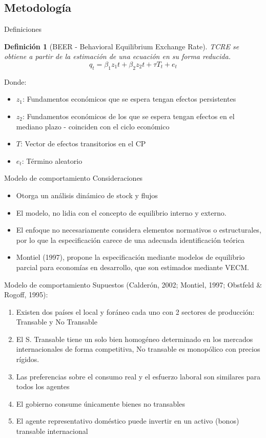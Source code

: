 \documentclass{beamer}
\newtheorem{definic}{Definición}[section]
\begin{document}
\subsection[Metodología]{Metodología}
\begin{frame}{Definiciones}
\begin{definic}[BEER - Behavioral Equilibrium Exchange Rate]
TCRE se obtiene a partir de la estimación de una ecuación en su forma reducida. 
\begin{equation}\label{BEER}
q_t=\beta_1 z_1t + \beta_2 z_2t + \tau T_t + e_t
\end{equation}
\end{definic}
Donde: 
\begin{itemize}
\item $z_1$: Fundamentos económicos que se espera tengan efectos persistentes
\item $z_2$: Fundamentos económicos de los que se espera tengan efectos en el mediano plazo - coinciden con el ciclo económico
\item $T$: Vector de efectos transitorios en el CP
\item $e_t$: Término aleatorio
\end{itemize}
\end{frame}

\begin{frame}{Modelo de comportamiento}
Consideraciones
\begin{itemize}
\item Otorga un análisis dinámico de stock y flujos
\item El modelo, no lidia con el concepto de equilibrio interno y externo.
\item El enfoque no necesariamente considera elementos normativos o estructurales, por lo que la especificación carece de una adecuada identificación teórica
\item Montiel (1997), propone la especificación mediante modelos de equilibrio parcial para economías en desarrollo, que son estimados mediante VECM.
\end{itemize}
\end{frame}

\begin{frame}{Modelo de comportamiento}
Supuestos (Calderón, 2002; Montiel, 1997; Obstfeld \& Rogoff, 1995): 
\begin{enumerate}
\item Existen dos países el local y foráneo cada uno con 2 sectores de producción: Transable y No Transable
\item El S. Transable tiene un solo bien homogéneo determinado en los mercados internacionales de forma competitiva, No transable es monopólico con precios rígidos.  
\item Las preferencias sobre el consumo real y el esfuerzo laboral son similares para todos los agentes
\item El gobierno consume únicamente bienes no transables
\item El agente representativo doméstico puede invertir en un activo (bonos) transable internacional 
\end{enumerate}
\end{frame}
\end{document}
